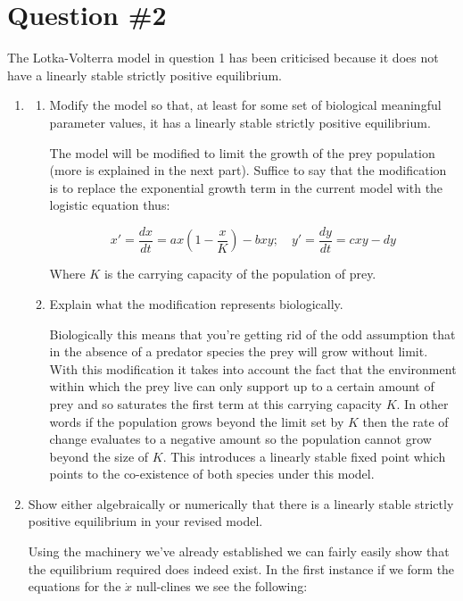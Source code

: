 \documentclass[11pt]{report}
\begin{document}
	\chapter*{Question \#2}
	The Lotka-Volterra model in question 1 has been criticised because it does not have a linearly stable strictly positive equilibrium.
		\begin{enumerate}[label=\alph*)]
			\item 
				\begin{enumerate}[label=\roman*)]
					\item Modify the model so that, at least for some set of biological meaningful parameter values, it has a linearly stable strictly positive equilibrium. 
					
					The model will be modified to limit the growth of the prey population (more is explained in the next part). Suffice to say that the modification is to replace the exponential growth term in the current model with the logistic equation thus:
					
					$$
					x' = \dfrac{dx}{dt} = ax\left(1-\dfrac{x}{K}\right) - bxy ; \quad y' = \dfrac{dy}{dt} = cxy - dy
					$$
					
					Where $K$ is the carrying capacity of the population of prey.
					
					\item Explain what the modification represents biologically.
					
					Biologically this means that you're getting rid of the odd assumption that in the absence of a predator species the prey will grow without limit. With this modification it takes into account the fact that the environment within which the prey live can only support up to a certain amount of prey and so saturates the first term at this carrying capacity $K$. In other words if the population grows beyond the limit set by $K$ then the rate of change evaluates to a negative amount so the population cannot grow beyond the size of $K$. This introduces a linearly stable fixed point which points to the co-existence of both species under this model.
					
				\end{enumerate}
			\item Show either algebraically or numerically that there is a linearly stable strictly positive equilibrium in your revised model.
			
			Using the machinery we've already established we can fairly easily show that the equilibrium required does indeed exist. In the first instance if we form the equations for the $\dot{x}$ null-clines we see the following:
			

\end{enumerate}
\end{document}
